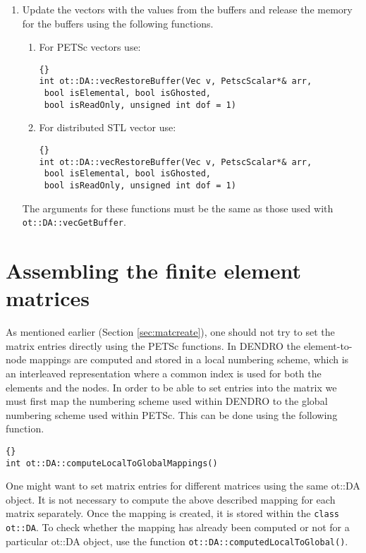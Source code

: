 \documentclass[10pt,reqno,a4paper]{report}
\numberwithin{equation}{section}
\begin{document}
\begin{enumerate}
\item Update the vectors with the values from the buffers and release the memory for the buffers using the following functions.

\begin{enumerate}

\item For PETSc vectors use:

\begin{lstlisting}[frame=trbl, fontadjust]{}
int ot::DA::vecRestoreBuffer(Vec v, PetscScalar*& arr, 
 bool isElemental, bool isGhosted,
 bool isReadOnly, unsigned int dof = 1)
\end{lstlisting}

\item For distributed STL vector use:

\begin{lstlisting}[frame=trbl, fontadjust]{}
int ot::DA::vecRestoreBuffer(Vec v, PetscScalar*& arr,
 bool isElemental, bool isGhosted,
 bool isReadOnly, unsigned int dof = 1)
\end{lstlisting}

\end{enumerate}

The arguments for these functions must be the same as those used with \lstinline[basicstyle=\bfseries]!ot::DA::vecGetBuffer!.

\end{enumerate}

\section{Assembling the finite element matrices}
\label{sec:matassemble}
As mentioned earlier (Section \ref{sec:matcreate}), one should not try to set the matrix entries directly using the PETSc functions. In DENDRO the element-to-node mappings are computed and stored in a local numbering scheme, which is an interleaved representation where a common index is used for both the elements and the nodes. In order to be able to set entries into the matrix we must first map the numbering scheme used within DENDRO to the global numbering scheme used within PETSc. This can be done using the following function.

\begin{lstlisting}[frame=trbl, fontadjust]{}
int ot::DA::computeLocalToGlobalMappings()
\end{lstlisting}

One might want to set matrix entries for different matrices using the same ot::DA object. It is not necessary to compute the above described mapping for each matrix separately. Once the mapping is created, it is stored within the \lstinline[basicstyle=\bfseries]!class ot::DA!. To check whether the mapping has already been computed or not for a particular ot::DA object, use the function \lstinline[basicstyle=\bfseries]!ot::DA::computedLocalToGlobal()!.
\end{document}
